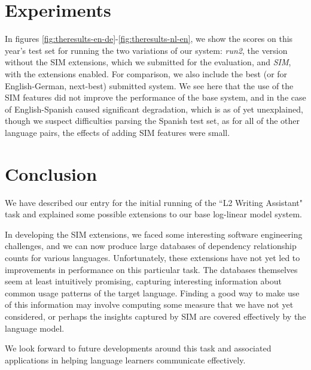 \documentclass[11pt]{article}
\begin{document}
\section{Experiments}
\label{sec:exp}

In figures \ref{fig:theresults-en-de}-\ref{fig:theresults-nl-en}, we show the scores on this year's test set for running
the two variations of our system: \emph{run2}, the version without the SIM
extensions, which we submitted for the evaluation, 
and \emph{SIM}, with the extensions
enabled. For comparison, we also include the best (or for English-German,
next-best) submitted system.
We see here that the use of the SIM features did not improve the performance of
the base system, and in the case of English-Spanish caused significant
degradation, which is as of yet unexplained, though we suspect difficulties
parsing the Spanish test set, as for all of the other language pairs, the
effects of adding SIM features were small.

\section{Conclusion} 
We have described our entry for the initial running of the ``L2 Writing
Assistant" task and explained some possible extensions to our base log-linear
model system.

In developing the SIM extensions, we faced some interesting software
engineering challenges, and we can now produce large databases of dependency
relationship counts for various languages. Unfortunately, these extensions have
not yet led to improvements in performance on this particular task. The
databases themselves seem at least intuitively promising, capturing interesting
information about common usage patterns of the target language.
Finding a good way to make use of this information may involve computing some
measure that we have not yet considered, or perhaps the insights captured by
SIM are covered effectively by the language model.

We look forward to future developments around this task and associated
applications in helping language learners communicate effectively.

\clearpage


\end{document}
